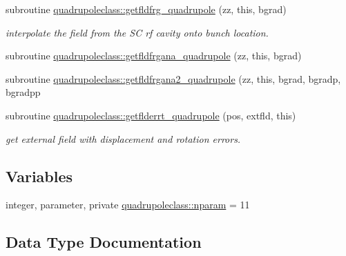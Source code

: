 \begin{DoxyCompactItemize}
subroutine \mbox{\hyperlink{namespacequadrupoleclass_a28a961157d94669d59f8c6f024995899}{quadrupoleclass\+::getfldfrg\+\_\+quadrupole}} (zz, this, bgrad)
\begin{DoxyCompactList}\small\item\em interpolate the field from the SC rf cavity onto bunch location. \end{DoxyCompactList}\item 
subroutine \mbox{\hyperlink{namespacequadrupoleclass_aac2c756ddd587ca842555670b0ad16b3}{quadrupoleclass\+::getfldfrgana\+\_\+quadrupole}} (zz, this, bgrad)
\item 
subroutine \mbox{\hyperlink{namespacequadrupoleclass_ab1abe8916ad3dace3e5d1373da4688ac}{quadrupoleclass\+::getfldfrgana2\+\_\+quadrupole}} (zz, this, bgrad, bgradp, bgradpp
\item 
subroutine \mbox{\hyperlink{namespacequadrupoleclass_a25a1f7329a298c01c802f96b0547ab6c}{quadrupoleclass\+::getflderrt\+\_\+quadrupole}} (pos, extfld, this)
\begin{DoxyCompactList}\small\item\em get external field with displacement and rotation errors. \end{DoxyCompactList}\end{DoxyCompactItemize}
\subsection*{Variables}
\begin{DoxyCompactItemize}
\item 
integer, parameter, private \mbox{\hyperlink{namespacequadrupoleclass_a8eba81bd9796e431c21d0f46260b0c6c}{quadrupoleclass\+::nparam}} = 11
\end{DoxyCompactItemize}


\subsection{Data Type Documentation}
\label{structquadrupoleclass_1_1quadrupole}
